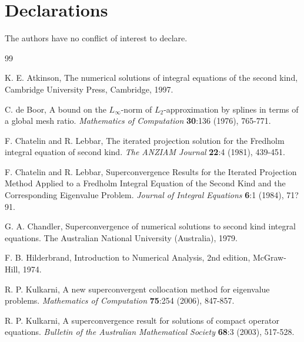 \documentclass[sn-mathphys-num]{sn-jnl}%
\theoremstyle{thmstyleone}%
\theoremstyle{thmstyletwo}%
\theoremstyle{thmstylethree}%
\begin{document}


\section*{Declarations}
The authors have no conflict of interest to declare.



\begin{thebibliography}{99}
	
	K. E. Atkinson, The numerical solutions of integral equations of the second kind, Cambridge University Press, Cambridge, 1997.
	
	 C. de Boor, A bound on the $L_\infty$-norm of $L_2$-approximation by splines in terms of a global mesh ratio. \textit{Mathematics of Computation} \textbf{30}:136 (1976), 765-771. 
	
	 F. Chatelin and R. Lebbar, The iterated projection solution for the Fredholm integral equation of second kind. \textit{The ANZIAM Journal} \textbf{22}:4 (1981), 439-451. 
	
	 F. Chatelin and R. Lebbar, Superconvergence Results for the Iterated Projection Method Applied to a Fredholm Integral Equation of the Second Kind and the Corresponding Eigenvalue Problem. \textit{Journal of Integral Equations} \textbf{6}:1 (1984), 71?91. 
	
	 G. A. Chandler, Superconvergence of numerical solutions to second kind integral equations. The Australian National University (Australia), 1979.
	
	F. B. Hilderbrand, Introduction to Numerical Analysis, 2nd edition, McGraw-Hill, 1974.
	
	 R. P. Kulkarni, A new superconvergent collocation method for eigenvalue problems. \textit{Mathematics of Computation} \textbf{75}:254 (2006), 847-857. 
	
	R. P. Kulkarni, A superconvergence result for solutions of compact operator equations.
	\textit{Bulletin of the Australian Mathematical Society } \textbf{68}:3 (2003), 517-528. 
	

\end{thebibliography}
\end{document}
